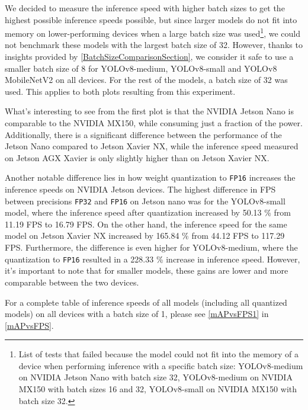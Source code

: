 We decided to measure the inference speed with higher batch sizes to get the
highest possible inference speeds possible, but since larger models do not fit
into memory on lower-performing devices when a large batch size was
used\footnote{List of tests that failed because the model could not fit into
the memory of a device when performing inference with a specific batch size:
YOLOv8-medium on NVIDIA Jetson Nano with batch size 32, YOLOv8-medium on NVIDIA
MX150 with batch sizes 16 and 32, YOLOv8-small on NVIDIA MX150 with batch size
32.}, we could not benchmark these models with the largest batch size of 32.
However, thanks to insights provided by \autoref{BatchSizeComparisonSection}, we
consider it safe to use a smaller batch size of 8 for YOLOv8-medium,
YOLOv8-small and YOLOv8 MobileNetV2 on all devices. For the rest of the models,
a batch size of 32 was used. This applies to both plots resulting from this
experiment.

What's interesting to see from the first plot is that the NVIDIA Jetson Nano is
comparable to the NVIDIA MX150, while consuming just a fraction of the power.
Additionally, there is a significant difference between the performance of the
Jetson Nano compared to Jetson Xavier NX, while the inference speed measured on
Jetson AGX Xavier is only slightly higher than on Jetson Xavier NX.

Another notable difference lies in how weight quantization to \texttt{FP16}
increases the inference speeds on NVIDIA Jetson devices. The highest difference
in FPS between precisions \texttt{FP32} and \texttt{FP16} on Jetson nano was for
the YOLOv8-small model, where the inference speed after quantization increased
by \num{50.13} \% from \num{11.19} FPS to \num{16.79} FPS. On the other hand,
the inference speed for the same model on Jetson Xavier NX increased by
\num{165.84} \% from \num{44.12} FPS to \num{117.29} FPS. Furthermore, the
difference is even higher for YOLOv8-medium, where the quantization to
\texttt{FP16} resulted in a \num{228.33} \% increase in inference speed.
However, it's important to note that for smaller models, these gains are lower
and more comparable between the two devices.

For a complete table of inference speeds of all models (including all quantized
models) on all devices with a batch size of 1, please see \autoref{mAPvsFPS1} in
\autoref{mAPvsFPS}.

